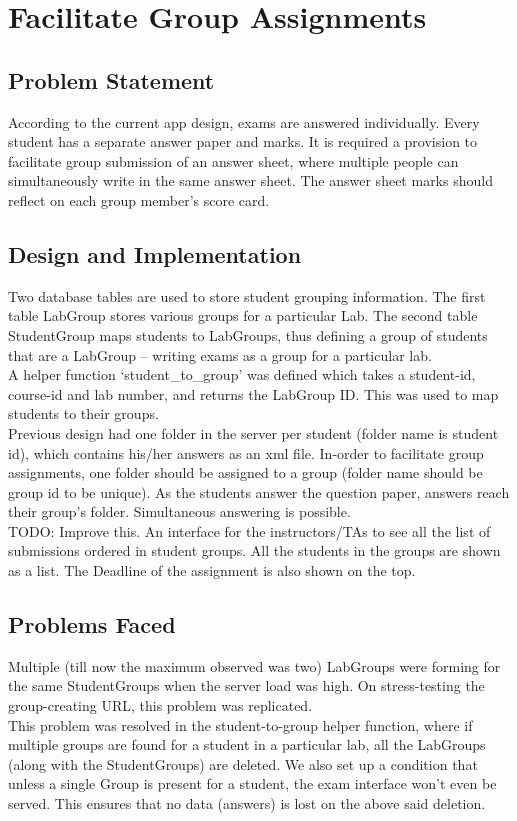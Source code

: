 \section{Facilitate Group Assignments}

\subsection{Problem Statement}
According to the current app design, exams are answered individually. Every student has a separate answer paper and marks. It is required a provision to facilitate group submission of an answer sheet, where multiple people can simultaneously write in the same answer sheet. The answer sheet marks should reflect on each group member's score card.

\subsection{Design and Implementation}
Two database tables are used to store student grouping information. The first table LabGroup stores various groups for a particular Lab. The second table StudentGroup maps students to LabGroups, thus defining a group of students that are a LabGroup -- writing exams as a group for a particular lab.\\

A helper function `student\_to\_group' was defined which takes a student-id, course-id and lab number, and returns the LabGroup ID. This was used to map students to their groups.\\

Previous design had one folder in the server per student (folder name is student id), which contains his/her answers as an xml file. In-order to facilitate group assignments, one folder should be assigned to a group (folder name should be group id to be unique). As the students answer the question paper, answers reach their group's folder. Simultaneous answering is possible.\\

TODO: Improve this. An interface for the instructors/TAs to see all the list of submissions ordered in student groups. All the students in the groups are shown as a list. The Deadline of the assignment is also shown on the top.

\subsection{Problems Faced}
Multiple (till now the maximum observed was two) LabGroups were forming for the same StudentGroups when the server load was high. On stress-testing the group-creating URL, this problem was replicated.\\
This problem was resolved in the student-to-group helper function, where if multiple groups are found for a student in a particular lab, all the LabGroups (along with the StudentGroups) are deleted. We also set up a condition that unless a single Group is present for a student, the exam interface won't even be served. This ensures that no data (answers) is lost on the above said deletion.

